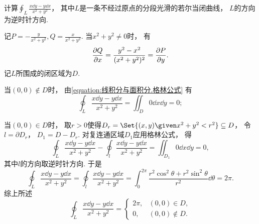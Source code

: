 \begin{example}
计算\(\oint_L \frac{x\dd{y}-y\dd{x}}{x^2+y^2}\)，
其中\(L\)是一条不经过原点的分段光滑的若尔当闭曲线，
\(L\)的方向为逆时针方向.
\begin{solution}
记\(P = -\frac{y}{x^2+y^2}, Q = \frac{x}{x^2+y^2}\).
当\(x^2+y^2\neq0\)时，
有\[
	\pdv{Q}{x} = \frac{y^2-x^2}{(x^2+y^2)^2} = \pdv{P}{y}.
\]
记\(L\)所围成的闭区域为\(D\).

当\((0,0) \notin D\)时，
由\cref{equation:线积分与面积分.格林公式} 有\[
	\oint_L \frac{x\dd{y}-y\dd{x}}{x^2+y^2} = \iint_D 0 \dd{x}\dd{y} = 0;
\]

当\((0,0) \in D\)时，
取\(r>0\)使得\(D_r = \Set{ (x,y) \given x^2+y^2 < r^2 } \subseteq D\)，
令\(l = \partial D_r\)，
\(D_1 = D - D_r\).
对复连通区域\(D_1\)应用格林公式，
得\[
	\oint_L \frac{x\dd{y}-y\dd{x}}{x^2+y^2} - \oint_l \frac{x\dd{y}-y\dd{x}}{x^2+y^2}
	= \iint_{D_1} 0 \dd{x}\dd{y} = 0,
\]
其中\(l\)的方向取逆时针方向.
于是\[
	\oint_L \frac{x\dd{y}-y\dd{x}}{x^2+y^2}
	= \oint_l \frac{x\dd{y}-y\dd{x}}{x^2+y^2}
	= \int_0^{2\pi} \frac{r^2 \cos^2\theta + r^2 \sin^2\theta}{r^2} \dd{\theta}
	= 2\pi.
\]
综上所述\[
	\oint_L \frac{x\dd{y}-y\dd{x}}{x^2+y^2}
	= \begin{cases}
		2\pi, & (0,0) \in D, \\
		0, & (0,0) \notin D.
	\end{cases}
\]
\end{solution}
\end{example}

